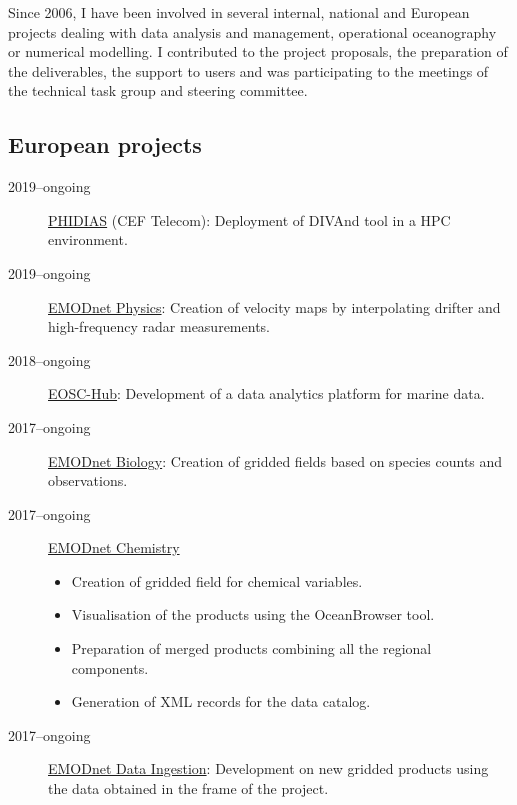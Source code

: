 \documentclass[11pt,a4paper,svgnames]{article}
\begin{document}
\begin{summarybox}
{Since 2006, I have been involved in several internal, national and European projects dealing with data analysis and management, operational oceanography or numerical modelling. I contributed to the project proposals, the preparation of the deliverables, the support to users and was participating to the meetings of the technical task group and steering committee.}
\end{summarybox}

\subsection{European projects}

\begin{description}

\item[2019--ongoing] \href{https://www.phidias-hpc.eu/}{PHIDIAS} (CEF Telecom): Deployment of DIVAnd tool in a HPC environment.

\item[2019--ongoing] \href{https://www.emodnet-physics.eu}{EMODnet Physics}: Creation of velocity maps by interpolating drifter and high-frequency radar measurements.

\item[2018--ongoing] \href{https://www.eosc-hub.eu}{EOSC-Hub}: Development of a data analytics platform for marine data.

\item[2017--ongoing] \href{https://emodnet-biology.eu}{EMODnet Biology}: Creation of gridded fields based on species counts and observations.

\item[2017--ongoing] \href{https://www.emodnet-chemistry.eu}{EMODnet Chemistry} 
\begin{itemize}
\item Creation of gridded field for chemical variables.
\item Visualisation of the products using the OceanBrowser tool.
\item Preparation of merged products combining all the regional components.
\item Generation of XML records for the data catalog.
\end{itemize}

\item[2017--ongoing] \href{https://www.emodnet-ingestion.eu}{EMODnet Data Ingestion}: Development on new gridded products using the data obtained in the frame of the project.


\end{description}
\end{document}
